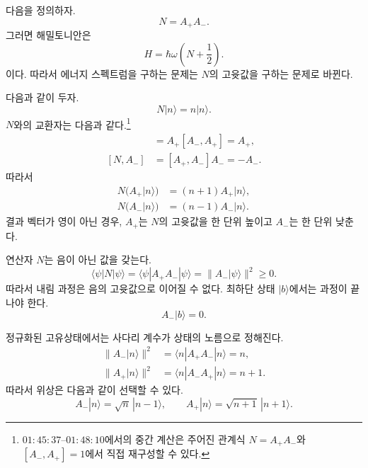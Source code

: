 다음을 정의하자.
\begin{equation}
N=A_+A_-.
\end{equation}
그러면 해밀토니안은
\begin{equation}
H=\hbar\omega\left(N+\frac{1}{2}\right).
\end{equation}
이다. 따라서 에너지 스펙트럼을 구하는 문제는 \(N\)의 고윳값을 구하는 문제로 바뀐다.

다음과 같이 두자.
\begin{equation}
N|n\rangle=n|n\rangle.
\end{equation}
\(N\)와의 교환자는 다음과 같다.\footnote{\(01{:}45{:}37\)--\(01{:}48{:}10\)에서의 중간 계산은 주어진 관계식 \(N=A_+A_-\)와 \([A_-,A_+]=1\)에서 직접 재구성할 수 있다.}
\begin{align}
[N,A_+]
&=A_+[A_-,A_+]=A_+, \\
[N,A_-]
&=[A_+,A_-]A_-=-A_-.
\end{align}
따라서
\begin{align}
N\bigl(A_+|n\rangle\bigr)
&=(n+1)A_+|n\rangle, \\
N\bigl(A_-|n\rangle\bigr)
&=(n-1)A_-|n\rangle.
\end{align}
결과 벡터가 영이 아닌 경우, \(A_+\)는 \(N\)의 고윳값을 한 단위 높이고 \(A_-\)는 한 단위 낮춘다.

연산자 \(N\)는 음이 아닌 값을 갖는다.
\begin{equation}
\langle\psi|N|\psi\rangle
=\langle\psi|A_+A_-|\psi\rangle
=\|A_-|\psi\rangle\|^2
\geq0.
\end{equation}
따라서 내림 과정은 음의 고윳값으로 이어질 수 없다. 최하단 상태 \(|b\rangle\)에서는 과정이 끝나야 한다.
\begin{equation}
A_-|b\rangle=0.
\end{equation}

정규화된 고유상태에서는 사다리 계수가 상태의 노름으로 정해진다.
\begin{align}
\|A_-|n\rangle\|^2
&=\langle n|A_+A_-|n\rangle=n, \\
\|A_+|n\rangle\|^2
&=\langle n|A_-A_+|n\rangle=n+1.
\end{align}
따라서 위상은 다음과 같이 선택할 수 있다.
\begin{equation}
A_-|n\rangle=\sqrt{n}\,|n-1\rangle,
\qquad
A_+|n\rangle=\sqrt{n+1}\,|n+1\rangle.
\end{equation}

\begin{classroomqa}\end{classroomqa}

